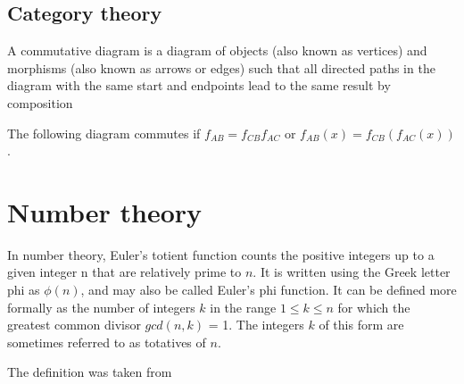 \begin{appendices}
\begin{theorem}
  \label{thm:isomorphismextension}
\end{theorem}

\subsection{Category theory}

\begin{definition}
  A commutative diagram is a diagram of objects (also known as
  vertices) and morphisms (also known as arrows or edges) such that
  all directed paths in the diagram with the same start and endpoints
  lead to the same result by composition
  \label{def:commutativediagram}

  The following diagram commutes if $f_{AB} = f_{CB} f_{AC}$ or
  $f_{AB}\left(x\right) = f_{CB} \left(f_{AC}\left(x\right)\right)$.

\end{definition}

\section{Number theory}

\begin{definition}
  In number theory, Euler's totient function counts the positive
  integers up to a given integer n that are relatively prime to $n$. It
  is written using the Greek letter phi as $\phi\left(n\right)$, and
  may also be called Euler's phi function. It can be defined more formally as
  the number of integers $k$ in the range $1 \le k \le n$ for which the
  greatest common divisor $gcd\left(n, k\right)$ = 1. The integers $k$ of this
  form are sometimes referred to as totatives of $n$.

  The definition was taken from \cite{wiki:eulerfunction}
  \label{def:eulerfuction}
\end{definition}


\end{appendices}
